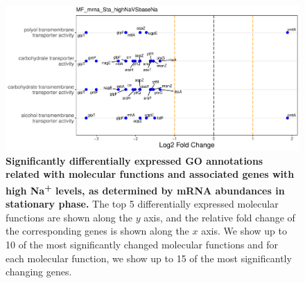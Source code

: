 \documentclass[a4paper]{article}
\begin{document}
\begin{figure}[!htb]
	\includegraphics[width=1.0\textwidth]{../../d_figures/MF15_mrna_Sta_highNaVSbaseNa_withTitle.pdf}
	\caption[Significantly differentially expressed GO annotations associated with molecular functions for mRNA samples in stationary phase tested for high Na\textsuperscript{+} levels against base Na\textsuperscript{+} levels]
	{\textbf{Significantly differentially expressed GO annotations related with molecular functions and associated genes with high Na\textsuperscript{+} levels, as determined by mRNA abundances in stationary phase.} The top 5 differentially expressed molecular functions are shown along the $y$ axis, and the relative fold change of the corresponding genes is shown along the $x$ axis. We show up to 10 of the most significantly changed molecular functions and for each molecular function, we show up to 15 of the most significantly changing genes.}
\end{figure}
\end{document}
